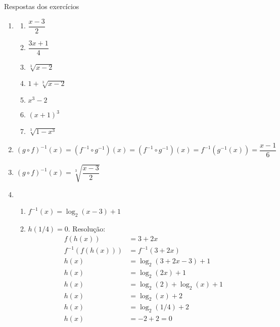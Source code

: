 \begin{frame}[allowframebreaks]{Respostas dos exercícios}
\begin{enumerate}
        \item 
        \begin{multicols}{2}
            \begin{enumerate}[a]
                \item $\dfrac{x-3}{2}$
                \item $\dfrac{3x+1}{4}$
                \item $\sqrt[3]{x-2}$
                \item $1 + \sqrt[3]{x-2}$
                \item $x^3 - 2$
                \item $(x+1)^3$
                \item $\sqrt[3]{1-x^3}$
            \end{enumerate}
        \end{multicols} 

        \skipframe

        \item $(g \circ f)^{-1}(x) = (f^{-1} \circ g^{-1})(x) = (f^{-1} \circ g^{-1})(x) = f^{-1}(g^{-1}(x)) = \dfrac{x-1}{6}$

        \item $(g \circ f)^{-1}(x) = \sqrt[3]{\dfrac{x-3}{2}}$

        \item 
        \begin{enumerate}[a]
            \item $f^{-1}(x) = \log_2 (x-3) + 1$

            \item $h(1/4) = 0$. Resolução:
            \begin{align*}
                f(h(x)) &= 3 + 2x \\
                f^{-1}(f(h(x))) &= f^{-1}(3 + 2x) \\
                h(x) &= \log_2 (3 + 2x - 3) + 1 \\
                h(x) &= \log_2 (2x) + 1 \\
                h(x) &= \log_2 (2) + \log_2 (x) + 1 \\
                h(x) &= \log_2 (x) + 2 \\
                h(x) &= \log_2 (1/4) + 2 \\
                h(x) &= -2 + 2 = 0 \\
            \end{align*}
        \end{enumerate}


\end{enumerate}
\end{frame}
